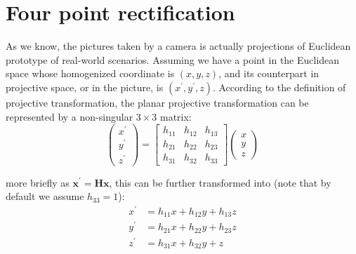 \documentclass[conference]{IEEEtran}
\newcommand{\mat}[1]{\mathbf{#1}} %
\begin{document}




%
\IEEEpeerreviewmaketitle



\section{Four point rectification}
As we know, the pictures taken by a camera is actually projections of Euclidean prototype of real-world scenarios. Assuming we have a point in the Euclidean space whose homogenized coordinate is $(x, y, z)$, and its counterpart in projective space, or in the picture, is $(x^\prime , y^\prime , z)$. According to the definition of projective transformation, the planar projective transformation can be represented by a non-singular $3\times 3$ matrix:
\begin{equation}
	\begin{pmatrix}
		x^\prime \\
		y^\prime \\
		z^\prime 
	\end{pmatrix}
	=
	\begin{bmatrix}
		h_{11} & h_{12} & h_{13}\\
		h_{21} & h_{22} & h_{23}\\
		h_{31} &  h_{32} & h_{33}
	\end{bmatrix}
	\begin{pmatrix}
		x\\
		y\\
		z
	\end{pmatrix}
\end{equation}

\noindent more briefly as $\mat{x^\prime} = \mat{H} \mat{x}$, this can be further transformed into (note that by default we assume $h_{33} = 1$):
\begin{equation}
	\begin{split}
		x^\prime &= h_{11}x + h_{12}y + h_{13}z\\
		y^\prime &= h_{21}x + h_{22}y + h_{23}z\\
		z^\prime &= h_{31}x + h_{32}y + z
	\end{split}
\end{equation}
\end{document}
